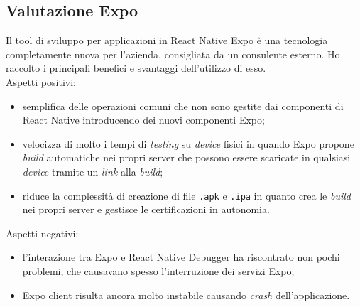 \subsection{Valutazione Expo}
Il tool di sviluppo per applicazioni in React Native Expo è una tecnologia completamente nuova per l'azienda, consigliata da un consulente esterno. Ho raccolto i principali benefici e svantaggi dell'utilizzo di esso.\\
Aspetti positivi:
\begin{itemize}
	\item semplifica delle operazioni comuni che non sono gestite dai componenti di React Native introducendo dei nuovi componenti Expo;
	\item velocizza di molto i tempi di \emph{testing} su \emph{device} fisici in quando Expo propone \emph{build} automatiche nei propri server che possono essere scaricate in qualsiasi \emph{device} tramite un \emph{link} alla \emph{build};
	\item riduce la complessità di creazione di file \texttt{.apk} e \texttt{.ipa} in quanto crea le \emph{build} nei propri server e gestisce le certificazioni in autonomia.
\end{itemize}
Aspetti negativi:
\begin{itemize}
	\item l'interazione tra Expo e React Native Debugger ha riscontrato non pochi problemi, che causavano spesso l'interruzione dei servizi Expo;
	\item Expo client risulta ancora molto instabile causando \emph{crash} dell'applicazione.
\end{itemize}

